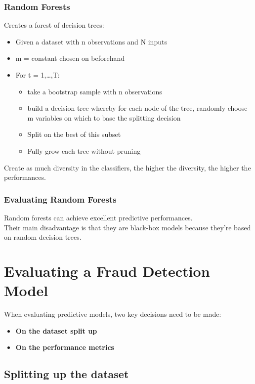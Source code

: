         \subsubsection{Random Forests}
            Creates a forest of decision trees:
            \begin{itemize}
                \item Given a dataset with n observations and N inputs 
                \item m = constant chosen on beforehand 
                \item For t = 1,\dots,T:
                \begin{itemize}
                    \item take a bootstrap sample with n observations 
                    \item build a decision tree whereby for each node of the tree, randomly choose m variables on which to base the splitting decision
                    \item Split on the best of this subset 
                    \item Fully grow each tree without pruning
                \end{itemize}
            \end{itemize}
            Create as much diversity in the classifiers, the higher the diversity, the higher the performances.
        \subsubsection{Evaluating Random Forests}
            Random forests can achieve excellent predictive performances.\\
            Their main disadvantage is that they are black-box models because they're based on random decision trees.
\section{Evaluating a Fraud Detection Model}
    When evaluating predictive models, two key decisions need to be made:
    \begin{itemize}
        \item \textbf{On the dataset split up}
        \item \textbf{On the performance metrics}
    \end{itemize}
    \subsection{Splitting up the dataset}
